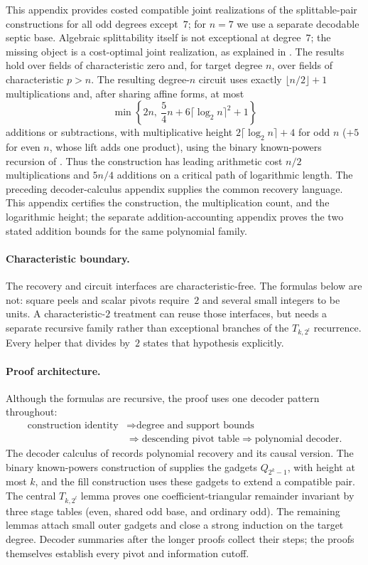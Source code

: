 
This appendix provides costed compatible joint realizations of the
splittable-pair constructions for all odd degrees except~$7$; for $n=7$ we
use a separate decodable septic base.  Algebraic splittability itself is not
exceptional at degree~$7$; the missing object is a cost-optimal joint
realization, as explained in .
The results hold over fields of characteristic zero and, for target degree
$n$, over fields of characteristic $p>n$.
The resulting degree-$n$ circuit uses exactly
$\lfloor n/2\rfloor+1$ multiplications and, after sharing affine forms,
at most
\[
   \min\!\left\{2n,\ \frac54n+6\lceil\log_2n\rceil^2+1\right\}
\]
additions or subtractions, with multiplicative height
$2\lceil\log_2 n\rceil+4$ for odd $n$ ($+5$ for even $n$, whose lift
adds one product), using the binary known-powers recursion of
.  Thus the construction has leading arithmetic
cost $n/2$ multiplications and $5n/4$ additions on a critical path of
logarithmic length.  The preceding
decoder-calculus appendix supplies the common recovery language.  This appendix
certifies the construction, the multiplication count, and the logarithmic
height; the separate addition-accounting appendix proves the two stated
addition bounds for the same polynomial family.

\paragraph{Characteristic boundary.}
The recovery and circuit interfaces are characteristic-free.  The formulas
below are not: square peels and scalar pivots require~$2$ and several small
integers to be units.  A characteristic-$2$ treatment can reuse those
interfaces, but needs a separate recursive family rather than exceptional
branches of the $T_{k,2^l}$ recurrence.  Every helper that divides by~$2$
states that hypothesis explicitly.

\paragraph{Proof architecture.}
Although the formulas are recursive, the proof uses one decoder pattern
throughout:
\[
\begin{aligned}
  \text{construction identity}
    &\Longrightarrow \text{degree and support bounds}\\
    &\Longrightarrow \text{descending pivot table}
     \Longrightarrow \text{polynomial decoder}.
\end{aligned}
\]
The decoder calculus of  records polynomial
recovery and its causal version.  The binary known-powers construction of
 supplies the gadgets $Q_{2^k-1}$, with height at most
$k$, and the fill construction uses these gadgets to extend a compatible
pair.  The central $T_{k,2^l}$ lemma proves one
coefficient-triangular remainder invariant by three stage tables (even,
shared odd base, and ordinary odd).  The remaining lemmas attach small outer
gadgets and close a strong induction on the target degree.  Decoder summaries
after the longer proofs collect their steps; the proofs themselves establish
every pivot and information cutoff.

